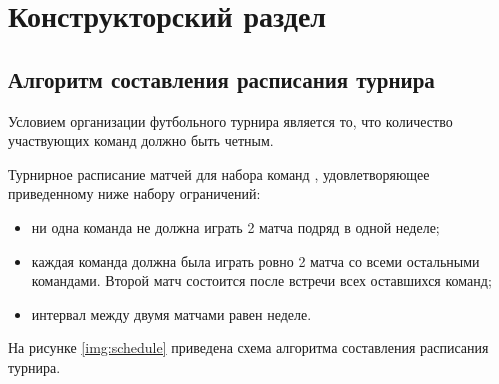 \section{Конструкторский раздел}

\subsection{Алгоритм составления расписания турнира}

Условием организации футбольного турнира является то, что количество участвующих команд должно быть четным.

Турнирное расписание матчей для набора команд , удовлетворяющее приведенному ниже набору ограничений:
\begin{itemize}
	\item ни одна команда не должна играть 2 матча подряд в одной неделе;
	\item каждая команда должна была играть ровно 2 матча со всеми остальными командами. Второй матч состоится после встречи всех оставшихся команд;
	\item интервал между двумя матчами равен неделе.
\end{itemize}

На рисунке \ref{img:schedule} приведена схема алгоритма составления расписания турнира.


